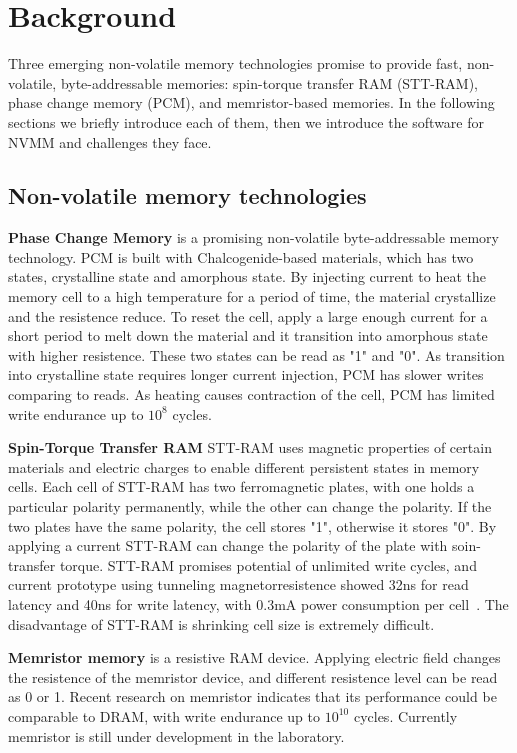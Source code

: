 \section{Background}
\label{sec:background}

Three emerging non-volatile memory technologies promise to provide fast,
 non-volatile, byte-addressable memories: spin-torque transfer RAM (STT-RAM),
phase change memory (PCM), and memristor-based memories. In the following
sections we briefly introduce each of them, then we introduce the software
for NVMM and challenges they face.

\subsection{Non-volatile memory technologies}
\label{sec:hardware}

\textbf{Phase Change Memory} is a promising non-volatile byte-addressable
memory technology. PCM is built with Chalcogenide-based materials, which has
two states, crystalline state and amorphous state. By
injecting current to heat the memory cell to a high temperature for a period
of time, the material crystallize and the resistence reduce. To reset the cell,
apply a large enough current for a short period to melt down the
material and it transition into amorphous state with higher resistence.
 These two states can be read as "1" and "0". As transition into crystalline
state requires longer current injection, PCM has slower writes comparing to
reads.  
As heating causes contraction of the cell, PCM has limited write endurance
up to $10^8$ cycles.
 
\textbf{Spin-Torque Transfer RAM} STT-RAM uses magnetic properties of 
certain materials and electric charges to enable different persistent states 
in memory cells. Each cell of STT-RAM has two ferromagnetic plates, with
one holds a particular polarity permanently, while the other can change the
polarity. If the two plates have the same polarity, the cell stores "1",
otherwise it stores "0". By applying a current STT-RAM can change the polarity
of the plate with soin-transfer torque.
STT-RAM promises potential of unlimited write cycles, and
current prototype using tunneling magnetorresistence showed 32ns for
read latency and 40ns for write latency, with 0.3mA power consumption
per cell~\cite{sttram}. The disadvantage of STT-RAM is shrinking cell size is
extremely difficult.

\textbf{Memristor memory} is a resistive RAM device. Applying electric field
changes the resistence of the memristor device, and different resistence level
can be read as 0 or 1. Recent research on memristor indicates that its
performance could be comparable to DRAM, with write endurance up to $10^{10}$
cycles. Currently memristor is still under development in the laboratory.
 
